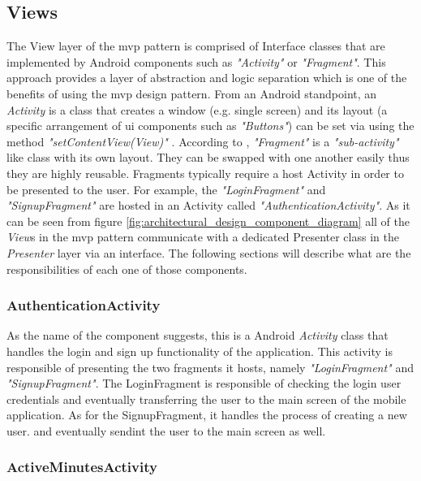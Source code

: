         \subsection{Views}
        The View layer of the \gls{mvp} pattern is comprised of Interface classes that are implemented by Android components such as \textit{"Activity"} or \textit{"Fragment"}. This approach provides a layer of abstraction and logic separation which is one of the benefits of using the \gls{mvp} design pattern. From an Android standpoint, an \textit{Activity} is a class that creates a window (e.g. single screen) and its layout (a specific arrangement of \gls{ui} components such as \textit{"Buttons"}) can be set via using the method \textit{"setContentView(View)"} \citep{googleactivity2017}. According to \citet{googlefragments2017}, \textit{"Fragment"} is a \textit{"sub-activity"} like class with its own layout. They can be swapped with one another easily thus they are highly reusable. Fragments typically require a host Activity in order to be presented to the user. For example, the \textit{"LoginFragment"} and \textit{"SignupFragment"} are hosted in an Activity called \textit{"AuthenticationActivity"}. As it can be seen from figure \ref{fig:architectural_design_component_diagram} all of the \textit{View}s in the \gls{mvp} pattern communicate with a dedicated Presenter class in the \textit{Presenter} layer via an interface. The following sections will describe what are the responsibilities of each one of those components.
            
            \subsubsection{AuthenticationActivity}
            As the name of the component suggests, this is a Android \textit{Activity} class that handles the login and sign up functionality of the application. This activity is responsible of presenting the two fragments it hosts, namely \textit{"LoginFragment"} and \textit{"SignupFragment"}. The LoginFragment is responsible of checking the login user credentials and eventually transferring the user to the main screen of the mobile application. As for the SignupFragment, it handles the process of creating a new user. and eventually sendint the user to the main screen as well.
            
            \subsubsection{ActiveMinutesActivity}
            
